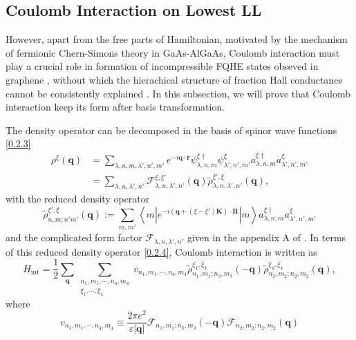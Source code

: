\documentclass[bachelor,english,numbers]{ustcthesis}
\begin{document}
		\subsection{Coulomb Interaction on Lowest LL}
			\indent\par However, apart from the free parts of Hamiltonian, motivated by the mechanism of fermionic Chern-Simons theory in GaAs-AlGaAs, Coulomb interaction must play a crucial role in formation of incompressible FQHE states obseved in graphene \cite{bolotin2009observation}, without which the hierachical structure of fraction Hall conductance cannot be consistently explained \cite{simon1998chern,lopez1991fractional}. In this subsection, we will prove that Coulomb interaction keep its form after basis transformation.\par
			The density operator can be decomposed in the basis of spinor wave functions \eqref{0.2.3}
			\begin{align*}
				\rho^{\xi}(\bm{q})&=\sum_{\lambda,n,m,\lambda',n',m'}e^{-i\bm{q}\cdot\bm{r}}\psi^{\xi\dagger}_{\lambda,n,m}\psi^{\xi}_{\lambda',n',m'}a_{\lambda,n,m}^{\xi\dagger}a_{\lambda',n',m'}^{\xi}\nonumber\\
				&=\sum_{\lambda,n,\lambda',n'}\mathcal{F}_{\lambda,n,\lambda',n'}^{\xi,\xi'}(\bm{q})\widetilde{\rho}^{\xi',\xi}_{\lambda,n,\lambda',n'}(\bm{q}),
			\end{align*}
			with the reduced density operator
			\begin{equation}\label{0.2.4}
				\widetilde{\rho}^{\xi',\xi}_{n,m;n'm'}(\bm{q}):=\sum_{m,m'}\left\langle m\left|e^{-i(\bm{q}+(\xi-\xi')\bm{K})\cdot\bm{R}}\right|m\right\rangle a_{\lambda,n,m}^{\xi\dagger}a_{\lambda',n',m'}^{\xi}
			\end{equation}
			and the complicated form factor $\mathcal{F}_{\lambda,n,\lambda',n'}$ given in the appendix A of \cite{goerbig2011electronic}. In terms of this reduced density operator \eqref{0.2.4}, Coulomb interaction is written as
			\begin{equation}\label{0.2.5}
			 	H_{\text{int}}=\dfrac{1}{2}\sum_{\bm{q}}\sum_{\substack{n_1,m_1,\cdots,n_4,m_4\\\xi_1,\cdots,\xi_4}}v_{n_1,m_1,\cdots,n_4,m_4}\widetilde{\rho}_{n_1,m_1;n_3,m_3}^{\xi_1,\xi_3}(\bm{-q})\widetilde{\rho}_{n_2,m_2;n_2,m_2}^{\xi_4,\xi_4}(\bm{q}),
			\end{equation}
			where
			\begin{equation*}
				v_{n_1,m_1,\cdots,n_4,m_4}\equiv\frac{2\pi e^2}{\varepsilon |\bm{q}|}\mathcal{F}_{n_1,m_1;n_3,m_3}(-\bm{q})\mathcal{F}_{n_2,m_2;n_2,m_2}(\bm{q})
			\end{equation*}
\end{document}
